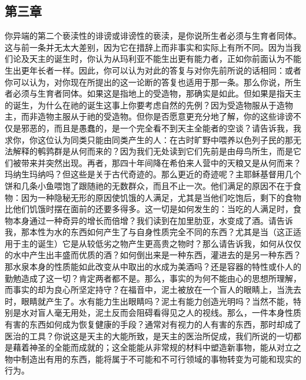 
\subsection{第三章}

\par

你异端的第二个亵渎性的诽谤或诽谤性的亵渎，是你说所生者必须与生育者同体。这与前一条并无太大差别，因为它在措辞上而非事实和实际上有所不同。因为当我们论及天主的诞生时，你认为从玛利亚不能生出更有能力者，正如你前面认为不能生出更年长者一样。因此，你可以认为对此的答复与对你先前所说的话相同：或者你可以认为，对你现在所提出的这一论断的答复也适用于那一条。那么你说，所生者必须与生育者同体。如果这是指地上的受造物，那确实是如此。但如果是指天主的诞生，为什么在祂的诞生这事上你要考虑自然的先例？因为受造物服从于造物主，而非造物主服从于祂的受造物。但你是否愿意更充分地了解，你的这些诽谤不仅是邪恶的，而且是愚蠢的，是一个完全看不到天主全能者的空谈？请告诉我，我求你，你这位认为同类只能由同类产生的人：在古时旷野中喂养以色列子民的那无法解释的鹌鹑群是从何而来的？因为我们无处读到它们先前是由母鸟所生，而是它们被带来并突然出现。再者，那四十年间降在希伯来人营中的天粮又是从何而来？玛纳生玛纳吗？但这些是关于古代奇迹的。那么更近的奇迹呢？主耶稣基督用几个饼和几条小鱼喂饱了跟随祂的无数群众，而且不止一次。他们满足的原因不在于食物：因为一种隐秘无形的原因使饥饿的人满足，尤其是当他们吃饱后，剩下的食物比他们饥饿时摆在面前的还要多得多。这一切是如何发生的：当吃的人满足时，食物本身通过一种奇异的增长而倍增？我们读到在加里肋亚，水变成了酒。请告诉我，那本性为水的东西如何产生了与自身性质完全不同的东西？尤其是当（这正适用于主的诞生）它是从较低劣之物产生更高贵之物时？那么请告诉我，如何从仅仅的水中产生出丰盛而优质的酒？如何倒出来是一种东西，灌进去的是另一种东西？那水泉本身的性质能如此改变从中取出的水成为美酒吗？还是容器的特性或仆人的勤勉造成了这一切？肯定两者都不是。那么，事实的为何不能由心的思想所理解，而事实的却为良心所坚定持守？在福音中，泥土被放在一个盲人的眼睛上，当洗去时，眼睛就产生了。水有能力生出眼睛吗？泥土有能力创造光明吗？当然不能，特别是水对盲人毫无用处，泥土反而会阻碍看得见之人的视线。那么，一件本身性质有害的东西如何成为恢复健康的手段？通常对有视力的人有害的东西，那时却成了医治的工具？你说这是天主的大能所致，是天主的医治所促成，我们所说的一切都是藉着神圣的全能而成就的；这全能能从非常规的材料中塑造新事物，能从对立之物中制造出有用的东西，能将属于不可能和不可行领域的事物转变为可能和现实的行为。\par

